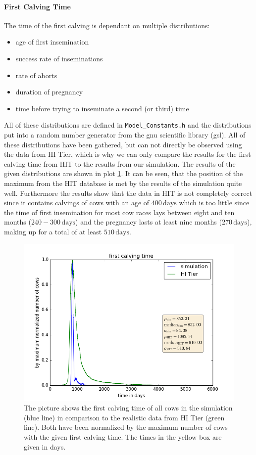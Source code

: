 \paragraph{First Calving Time}
The time of the first calving is dependant on multiple distributions:
\begin{itemize}
\item age of first insemination
\item success rate of inseminations
\item rate of aborts
\item duration of pregnancy 
\item time before trying to inseminate a second (or third) time
\end{itemize}
All of these distributions are defined in {\tt Model\_Constants.h} and the distributions put into a random number generator from the gnu scientific library (gsl). All of these distributions have been gathered, but can not directly be observed using the data from HI Tier, which is why we can only compare the results for the first calving time from HIT to the results from our simulation.
The results of the given distributions are shown in plot \ref{fig:firstCalvingTime}. 
It can be seen, that the position of the maximum from the HIT database is met by the results of the simulation quite well. Furthermore the results show that the data in HIT is not completely correct since it contains calvings of cows with an age of $400\,\text{days}$ which is too little since the time of first insemination for most cow races lays between eight and ten months ($240-300\,\text{days}$) and the pregnancy lasts at least nine months ($270\,\text{days}$), making up for a total of at least $510\,\text{days}$. 
\begin{figure}[htbp]
\centering
\noindent\includegraphics[width=0.8\linewidth,height=\textheight,
keepaspectratio]{firstCalvingTimesNormalwithCSV.png} 
\caption[First Calving Time]{The picture shows the first calving time of all cows in the simulation (blue line) in comparison to the realistic data from HI Tier (green line). Both have been normalized by the maximum number of cows with the given first calving time. The times in the yellow box are given in days.}
\label{fig:firstCalvingTime}
\end{figure}
